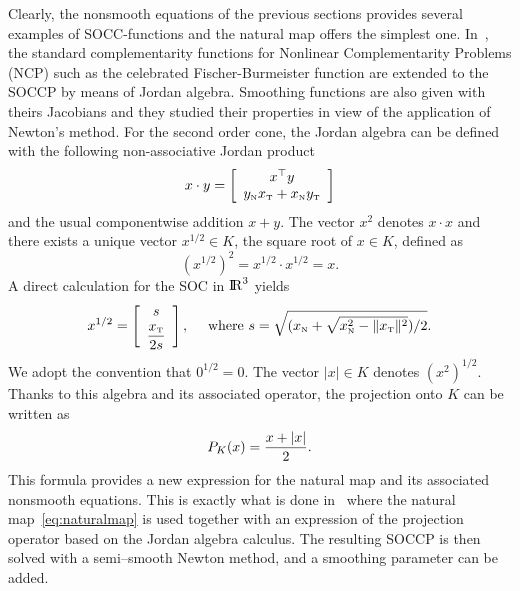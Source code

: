 {Clearly, the nonsmooth equations of the previous sections provides several examples of SOCC-functions and the natural map offers the simplest one. In~\cite{Fukushima.ea2001}, the standard complementarity functions for Nonlinear Complementarity Problems (NCP) such as the celebrated Fischer-Burmeister function are extended to the SOCCP by means of Jordan algebra. Smoothing functions are also given with theirs Jacobians and they studied their properties in view of the application of Newton's method.  For the second order cone, the Jordan algebra can be defined with the following non-associative Jordan product
\begin{equation}
  \label{eq:Jordan-product}
  x \cdot y =
  \left[\begin{array}{c}
      x^\top y \\
      y_\n x_\t + x_\n y_\t
  \end{array}
\right]
\end{equation}
and the usual componentwise addition $x+y$. The vector $x^2$ denotes $x\cdot x$ and there exists a unique vector $x^{1/2}\in K$, the square root of  $x\in K$, defined as
\begin{equation}
  \label{eq:Jordan-sqrt}
  (x^{1/2})^2 = x^{1/2} \cdot x^{1/2} = x.
\end{equation}
A direct calculation for the SOC in $\mathrm{I\!R}^3$ yields
\begin{equation}
  \label{eq:Jordan-sqrt2}
  x^{1/2} =
  \left[\begin{array}{c}
    s \\[1mm]
    \Frac {x_\t} {2s}
  \end{array}\right], \quad \text{ where } s = \sqrt{(x_\n+\sqrt{x_\n^2 - \|x_\t\|^2})/2}.
\end{equation}
We adopt the convention that $0^{1/2}=0$. The vector $|x| \in K$ denotes $(x^2)^{1/2}$. Thanks to this algebra and its associated operator, the projection onto $K$ can be written as
\begin{equation}
  \label{eq:Jordan-projection}
  P_K(x) = \Frac{x + |x|}2.
\end{equation}
This formula provides a new expression for the natural map and its associated nonsmooth equations. This is exactly what is done in~\cite{Hayashi.ea_SIOPT2005} where the natural map~\eqref{eq:naturalmap} is used together with an expression of the projection operator based on the Jordan algebra calculus. The resulting SOCCP is then solved with a semi--smooth Newton method, and a smoothing parameter can be added.

}
